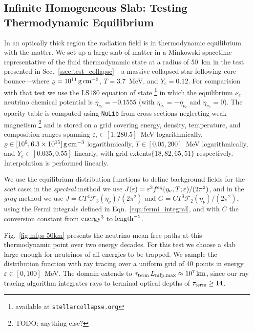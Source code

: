 \documentclass[aps,floatfix,prd,superscriptaddress,twocolumn]{revtex4-1}
\begin{document}
\subsection{Infinite Homogeneous Slab:
  Testing Thermodynamic Equilibrium}
\label{ssec:test_equilibrium}
In an optically thick region the radiation field is in thermodynamic equilibrium
with the matter.
We set up a large slab of matter in a Minkowski spacetime
representative of the fluid thermodynamic state at a radius of 50~km
in the test presented in Sec.~\ref{ssec:test_collapse}---a
massive collapsed star following core bounce---where
$\varrho=10^{11}\,{\rm g}\,{\rm cm}^{-3}$, $T=3.7$~MeV, and $Y_e=0.12$.
For comparision with that test we use the LS180 equation of state
\cite{latt1991-nuc_eos}
\footnote{available at \lstinline{stellarcollapse.org}}
in which the equilibrium $\nu_e$ neutrino chemical potential is
$\eta_{\nu_e}=-0.1555$
(with $\eta_{\bar{\nu}_e}=-\eta_{\nu_e}$ and $\eta_{\nu_x}=0$).
The opacity table is computed using \lstinline{NuLib} from cross-sections
neglecting weak magnetism
\footnote{TODO: anything else?}
and is stored on a grid covering energy, density, temperature, and composition
ranges spanning $\varepsilon_i\in[1,280.5]$~MeV logarithmically,
$\varrho\in[10^6,6.3\times10^{15}]\,{\rm g}\,{\rm cm}^{-3}$ logarithmically,
$T\in[0.05,200]$~MeV logarithmically, and 
$Y_e\in[0.035,0.55]$ linearly,
with grid extents$\{18,82,65,51\}$ respectively.
Interpolation is performed linearly.

We use the equilibrium distribution functions to define background
fields for the \emph{scat} case:
in the \emph{spectral} method we use
$J(\varepsilon)=\varepsilon^3 f^{\rm eq}(\eta_\nu,T;\varepsilon)/(2\pi^2)$,
and in the \emph{gray} method we use
$J=C T^4 \mathscr{F}_3(\eta_\nu)/(2\pi^2)$ and
$G=C T^3 \mathscr{F}_2(\eta_\nu)/(2\pi^2)$,
using the Fermi integrals defined in Eqn.~\ref{eqn:fermi_integral},
and with $C$ the conversion constant from ${\rm energy}^3$ to ${\rm length}^{-3}$.

Fig.~\ref{fig:mfps-50km} presents the neutrino mean free paths
at this thermodynamic point over two energy decades.
For this test we choose a slab large enough for neutrinos of all
energies to be trapped.
We sample the distribution function with ray tracing over a uniform grid
of 40 points in energy $\varepsilon \in [0,100]$~MeV.
The domain extends to $\tau_{\rm term}\,L_{\rm mfp,max}\approx10^7\,{\rm km}$,
since our ray tracing algorithm integrates rays to terminal optical
depths of $\tau_{\rm term}\geq14$.
\end{document}
